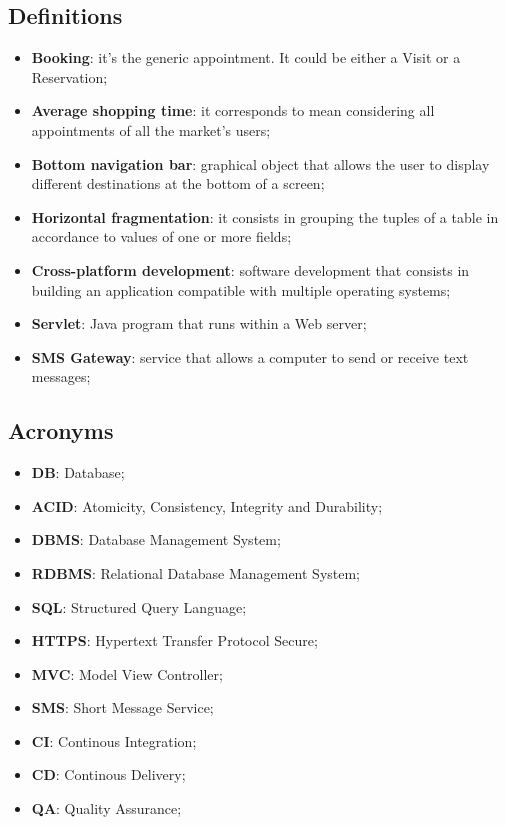 \subsection{Definitions}
\begin{itemize}

\item \textbf{Booking}: it's the generic appointment. It could be either a Visit or a Reservation;
\item \textbf{Average shopping time}: it corresponds to mean considering all appointments of all the market's users; 
\item \textbf{Bottom navigation bar}: graphical object that allows the user to display different destinations at the bottom of a screen;
\item \textbf{Horizontal fragmentation}: it consists in grouping the tuples of a table in accordance to values of one or more fields;
\item \textbf{Cross-platform development}: software development that consists in building an application compatible with multiple operating systems;
\item \textbf{Servlet}: Java program that runs within a Web server;
\item \textbf{SMS Gateway}: service that allows a computer to send or receive text messages; 
\end{itemize}
\subsection{Acronyms}
\begin{itemize}
\item \textbf{DB}: Database;
\item \textbf{ACID}: Atomicity, Consistency, Integrity and Durability;
\item \textbf{DBMS}: Database Management System;
\item \textbf{RDBMS}: Relational Database Management System;
\item \textbf{SQL}: Structured Query Language;
\item \textbf{HTTPS}: Hypertext Transfer Protocol Secure;
\item \textbf{MVC}: Model View Controller;
\item \textbf{SMS}: Short Message Service;
\item \textbf{CI}: Continous Integration;
\item \textbf{CD}: Continous Delivery;
\item \textbf{QA}: Quality Assurance;
\end{itemize}


